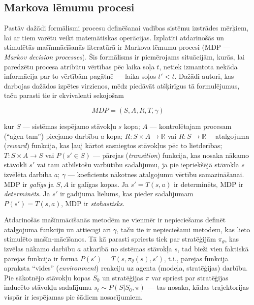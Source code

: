 \documentclass[12pt, a4paper]{article}
\numberwithin{equation}{section} %
\begin{document}
\subsection{Markova lēmumu procesi}

Pastāv dažādi formālismi procesu definēšanai vadības sistēmu izstrādes mērķiem, lai ar tiem varētu veikt matemātiskas operācijas. Izplatīti atdarinošās un stimulētās mašīnmācīšanās literatūrā ir Markova lēmumu procesi (MDP --- \textit{Markov decision processes}). Šis formālisms ir piemērojams  situācijām, kurās, lai paredzētu procesa atribūtu vērtības pēc laika soļa $t$, netiek izmantota nekāda informācija par to vērtībām pagātnē --- laika soļos $t' < t$. Dažādi autori, kas darbojas dažādos izpētes virzienos, mēdz piedāvāt atšķirīgus tā formulējumus, taču parasti tie ir ekvivalenti sekojošam \cite{attia2018global}

\begin{equation} 
    MDP = (S,A,R,T, \gamma)
\end{equation}

kur $S$ --- sistēmas iespējamo stāvokļu $s$ kopa; $A$ --- kontrolētajam procesam (``aģen-tam'') pieejamo darbību $a$ kopa; $R: S \times A \rightarrow \mathbb{R}$ vai $R: S \rightarrow \mathbb{R}$--- atalgojuma (\textit{reward}) funkcija, kas ļauj kārtot sasniegtos stāvokļus pēc to lietderības; $T: S \times A \rightarrow S$ vai $P(s' \in S)$ --- pārejas (\textit{transition}) funkcija, kas nosaka nākamo stāvokli $s'$ vai tam atbilstošu varbūtību sadalījumu, ja pie iepriekšējā stāvokļa $s$ izvēlēta darbība $a$; $\gamma$ --- koeficients nākotnes atalgojumu vērtību samazināšanai. MDP ir \textit{galīgs} ja $S,A$ ir galīgas kopas. Ja $s' = T(s,a)$ ir determinēts, MDP ir \textit{determinēts}. Ja $s'$ ir gadījuma lielums, kas pieder sadalījumam $P(s')=T(s,a)$, MDP ir \textit{stohastisks}.

Atdarinošās mašīnmācīšanās metodēm ne vienmēr ir nepieciešams definēt atalgojuma funkciju un attiecīgi arī $\gamma$, taču tie ir nepieciešami metodēm, kas lieto stimulēto mašīn-mācīšanos. Tā kā parasti spriests tiek par stratēģijām $\pi_{\theta}$, kas izvēlas nākamo darbību $a$ atkarībā no sistēmas stāvokļa $s$, tad bieži vien faktiskā pārejas funkcija ir formā $P(s') = T(s, \pi_{\theta}(s), s')$, t.i., pārejas funkcija apraksta ``vides'' (\textit{environment}) reakciju uz aģenta (modeļa, stratēģijas) darbību. Pie sākotnējo stāvokļu kopas $S_0$ un stratēģijas $\pi$ var spriest par stratēģijas inducēto stāvokļu sadalījumu $s_t \sim P(S \vert S_0, \pi)$ --- tas nosaka, kādas trajektorijas vispār ir iespējamas pie šādiem nosacījumiem. 
\end{document}
